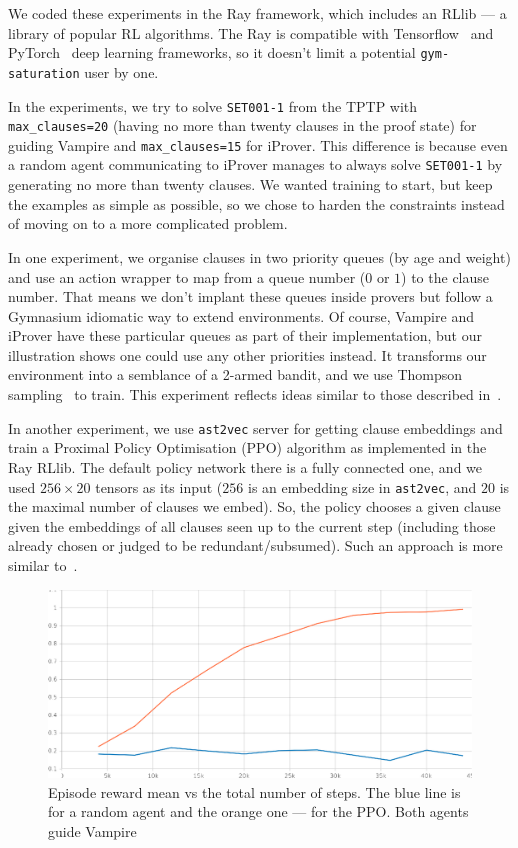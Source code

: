 \documentclass[runningheads]{llncs}
\begin{document}
We coded these experiments in the Ray framework, which includes an RLlib --- a library of popular RL algorithms. The Ray is compatible with Tensorflow~\cite{tensorflow2015-whitepaper} and PyTorch~\cite{NEURIPS2019_bdbca288} deep learning frameworks, so it doesn't limit a potential \texttt{gym-saturation} user by one.

In the experiments, we try to solve \texttt{SET001-1} from the TPTP with \texttt{max\_clauses=20} (having no more than twenty clauses in the proof state) for guiding Vampire and \texttt{max\_clauses=15} for iProver. This difference is because even a random agent communicating to iProver manages to always solve \texttt{SET001-1} by generating no more than twenty clauses. We wanted training to start, but keep the examples as simple as possible, so we chose to harden the constraints instead of moving on to a more complicated problem.

In one experiment, we organise clauses in two priority queues (by age and weight) and use an action wrapper to map from a queue number ($0$ or $1$) to the clause number. That means we don't implant these queues inside provers but follow a Gymnasium idiomatic way to extend environments. Of course, Vampire and iProver have these particular queues as part of their implementation, but our illustration shows one could use any other priorities instead. It transforms our environment into a semblance of a 2-armed bandit, and we use Thompson sampling~\cite{pmlr-v28-agrawal13} to train. This experiment reflects ideas similar to those described in~\cite{10.1007/978-3-031-10769-6_38}.

In another experiment, we use \texttt{ast2vec} server for getting clause embeddings and train a Proximal Policy Optimisation (PPO) algorithm as implemented in the Ray RLlib. The default policy network there is a fully connected one, and we used $256\times20$ tensors as its input ($256$ is an embedding size in \texttt{ast2vec}, and $20$ is the maximal number of clauses we embed). So, the policy chooses a given clause given the embeddings of all clauses seen up to the current step (including those already chosen or judged to be redundant/subsumed). Such an approach is more similar to~\cite{FLoP}.

\begin{figure}[H]
\includegraphics[width=\textwidth]{mean-reward}
\caption{Episode reward mean vs the total number of steps. The blue line is for a random agent and the orange one --- for the PPO. Both agents guide Vampire}\label{fig:mean-reward}
\end{figure}
\end{document}
